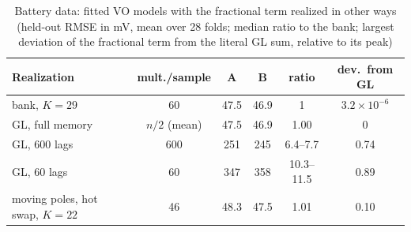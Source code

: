 \begin{table}[t]
\caption{Battery data: fitted VO models with the fractional term realized in other ways (held-out RMSE in mV, mean over 28 folds; median ratio to the bank; largest deviation of the fractional term from the literal GL sum, relative to its peak)}\label{tab:battreal}
\centering\scriptsize\setlength{\tabcolsep}{2.2pt}
\begin{tabular}{@{}lccccc@{}}
\toprule
Realization & mult./sample & A & B & ratio & dev.\ from GL\\
\midrule
bank, $K=29$ & 60 & 47.5 & 46.9 & 1 & $3.2\times10^{-6}$\\
GL, full memory & $n/2$ (mean) & 47.5 & 46.9 & 1.00 & 0\\
GL, 600 lags & 600 & 251 & 245 & 6.4--7.7 & 0.74\\
GL, 60 lags & 60 & 347 & 358 & 10.3--11.5 & 0.89\\
moving poles, hot swap, $K=22$ & 46 & 48.3 & 47.5 & 1.01 & 0.10\\
\bottomrule
\end{tabular}
\end{table}

